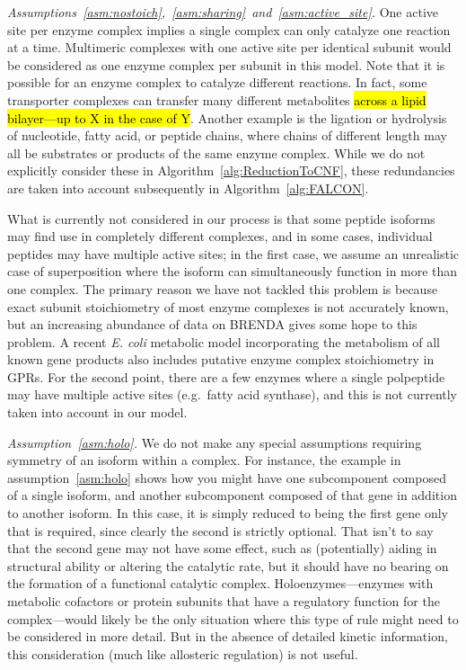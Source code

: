 \emph{Assumptions~\ref{asm:nostoich},~\ref{asm:sharing}~and~\ref{asm:active_site}.}
One active site per enzyme complex implies a single complex can only
catalyze one reaction at a time. Multimeric complexes with one active
site per identical subunit would be considered as one enzyme complex
per subunit in this model.  Note that it is possible for an enzyme
complex to catalyze different reactions. In fact, some transporter
complexes can transfer many different metabolites \hl{across a lipid
  bilayer---up to X in the case of Y}. Another example is the ligation or hydrolysis of
nucleotide, fatty acid, or peptide chains, where chains of different
length may all be substrates or products of the same enzyme
complex. While we do not explicitly consider these in
Algorithm~\ref{alg:ReductionToCNF}, these redundancies are taken into
account subsequently in Algorithm~\ref{alg:FALCON}.

What is currently not considered in our process is that some peptide
isoforms may find use in completely different complexes, and in some
cases, individual peptides may have multiple active sites; in the
first case, we assume an unrealistic case of superposition where the
isoform can simultaneously function in more than one complex. The
primary reason we have not tackled this problem is because exact
subunit stoichiometry of most enzyme complexes is not accurately
known, but an increasing abundance of data on BRENDA
\citep{Schomburg2013} gives some hope to this problem. A recent
\textit{E. coli} metabolic model incorporating the metabolism of all
known gene products \citep{O'Brien2013} also includes putative
enzyme complex stoichiometry in GPRs. For the second point, there
are a few enzymes where a single polpeptide may have multiple active
sites (e.g.\ fatty acid synthase), and this is not currently taken into
account in our model. 

\emph{Assumption~\ref{asm:holo}.}
We do not make any special assumptions requiring symmetry of an
isoform within a complex. For instance, the example in
assumption~\ref{asm:holo} shows how you might have one subcomponent
composed of a single isoform, and another subcomponent composed of
that gene in addition to another isoform. In this case, it is simply
reduced to being the first gene only that is required, since clearly
the second is strictly optional. That isn't to say that the second
gene may not have some effect, such as (potentially) aiding in
structural ability or altering the catalytic rate, but it should have
no bearing on the formation of a functional catalytic
complex. Holoenzymes---enzymes with metabolic cofactors or protein
subunits that have a regulatory function for the complex---would
likely be the only situation where this type of rule might need to be
considered in more detail. But in the absence of detailed kinetic
information, this consideration (much like allosteric
regulation) is not useful.


